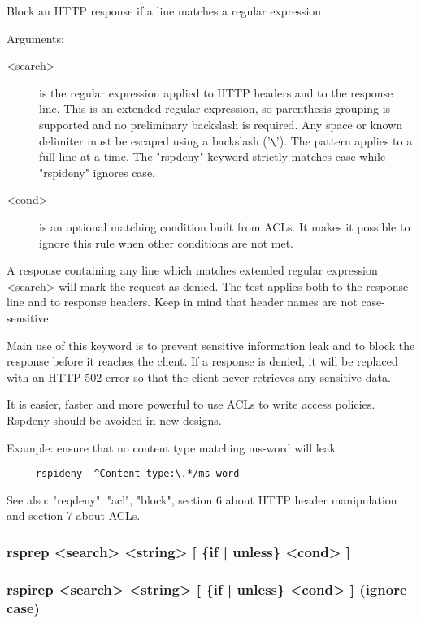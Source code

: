 
  Block an HTTP response if a line matches a regular expression


  Arguments:
  \begin{description}
  \item[<search>] is the regular expression applied to HTTP headers and to the
              response line. This is an extended regular expression, so
              parenthesis grouping is supported and no preliminary backslash
              is required. Any space or known delimiter must be escaped using
              a backslash ('\verb|\|'). The pattern applies to a full line at a time.
              The "rspdeny" keyword strictly matches case while "rspideny"
              ignores case.

  \item[<cond>] is an optional matching condition built from ACLs. It makes it
              possible to ignore this rule when other conditions are not met.
  \end{description}

  A response containing any line which matches extended regular expression
  <search> will mark the request as denied. The test applies both to the
  response line and to response headers. Keep in mind that header names are not
  case-sensitive.

  Main use of this keyword is to prevent sensitive information leak and to
  block the response before it reaches the client. If a response is denied, it
  will be replaced with an HTTP 502 error so that the client never retrieves
  any sensitive data.

  It is easier, faster and more powerful to use ACLs to write access policies.
  Rspdeny should be avoided in new designs.

  Example: ensure that no content type matching ms-word will leak
  \begin{verbatim}
     rspideny  ^Content-type:\.*/ms-word
  \end{verbatim}

  See also: "reqdeny", "acl", "block", section 6 about HTTP header manipulation
            and section 7 about ACLs.

\subsubsection[rsprep]{rsprep <search> <string> [ \{if | unless\} <cond> ]}
\subsubsection[rspirep]{rspirep <search> <string> [ \{if | unless\} <cond> ]  (ignore case)}

